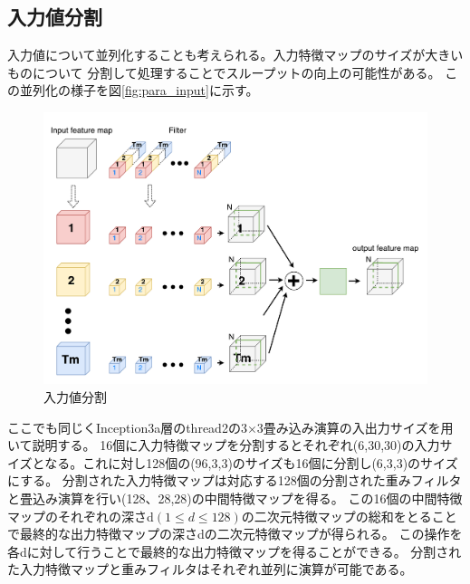 {\subsection{入力値分割}
\label{subsec:para_input}
入力値について並列化することも考えられる。入力特徴マップのサイズが大きいものについて
分割して処理することでスループットの向上の可能性がある。
この並列化の様子を図\ref{fig:para_input}に示す。
\begin{figure}[h]
    \centering
    \includegraphics[width=12cm]{./chap5/fig/conv_para_input.pdf}
    \caption{入力値分割}
    \label{fig:conv_para_input}
\end{figure}
ここでも同じくInception3a層のthread2の3$\times$3畳み込み演算の入出力サイズを用いて説明する。
16個に入力特徴マップを分割するとそれぞれ(6,30,30)の入力サイズとなる。これに対し128個の(96,3,3)のサイズも16個に分割し(6,3,3)のサイズにする。
分割された入力特徴マップは対応する128個の分割された重みフィルタと畳込み演算を行い(128、28,28)の中間特徴マップを得る。
この16個の中間特徴マップのそれぞれの深さd$(1 \leq d \leq 128)$の二次元特徴マップの総和をとることで最終的な出力特徴マップの深さdの二次元特徴マップが得られる。
この操作を各dに対して行うことで最終的な出力特徴マップを得ることができる。
分割された入力特徴マップと重みフィルタはそれぞれ並列に演算が可能である。

}